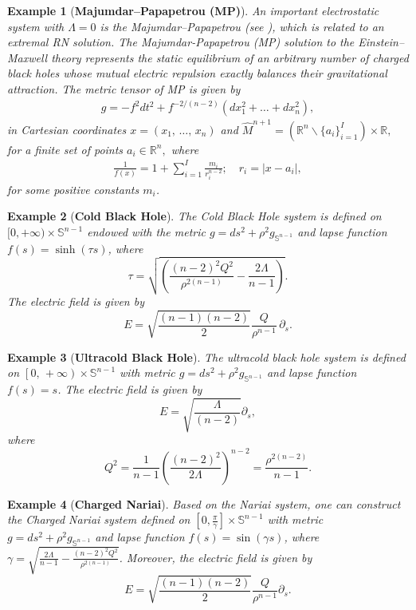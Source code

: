 \documentclass{amsart}
\newtheorem{example}{Example}
\numberwithin{equation}{section}
\begin{document}
\begin{example}[\textbf{Majumdar–Papapetrou (MP)}]	
An important electrostatic system with $\Lambda=0$ is the {\it Majumdar–Papapetrou} (see \cite{chrusciel1999,Lucietti}), which is related to an extremal RN solution. The Majumdar-Papapetrou (MP) solution to the Einstein–Maxwell theory represents the static equilibrium of an arbitrary number of charged black holes whose mutual electric repulsion exactly balances their gravitational attraction. The metric tensor of MP is given by
	\begin{eqnarray}\label{MPmetric}
		\hat{g}=-f^{2}dt^{2}+f^{-2/(n-2)}(dx_1^{2}+\ldots+dx_n^{2}),
	\end{eqnarray}
	in Cartesian coordinates $x=(x_1,\,\ldots,\,x_n)$ and $\widehat{M}^{n+1}=(\mathbb{R}^{n}\backslash\{{a_i}\}_{i=1}^I)\times\mathbb{R},$ for a finite set of points ${a_i}\in\mathbb{R}^{n},$ where
	\begin{eqnarray}\label{harmonic function MP}
		\frac{1}{f({x})}=1+\displaystyle\sum_{i=1}^{I}\frac{m_i}{r_i^{n-2}};\quad r_i=|{x}-{a_i}|,
	\end{eqnarray}
	for some positive constants $m_i$.	
\end{example}

\begin{example}[\textbf{Cold Black Hole}]
The {\it Cold Black Hole system} is defined on \( [0, +\infty) \times \mathbb{S}^{n-1} \) endowed with the metric $g = ds^{2} + \rho^{2} g_{\mathbb{S}^{n-1}}$ and lapse function $f(s) = \sinh(\tau s)$, where 
\[
\tau = \sqrt{\left( \frac{(n-2)^2 Q^{2}}{\rho^{2(n-1)}} - \frac{2\Lambda}{n-1} \right)}.
\] The electric field is given by
\[
E = \sqrt{\frac{(n-1)(n-2)}{2}} \frac{Q}{\rho^{n-1}} \, \partial_s.
\]
\end{example}		

\begin{example}[\textbf{Ultracold Black Hole}]
The {\it ultracold black hole system} is defined on $\left[0,\,+\infty\right)\times\mathbb{S}^{n-1}$ with metric $g = ds^{2} + \rho^{2}g_{\mathbb{S}^{n-1}}$ and lapse function $f(s) = s$. The electric field is given by 
$$E =\sqrt{\dfrac{\Lambda}{(n-2)}}\partial_s,$$
where 
$$Q^2=\frac{1}{n-1}\left(\frac{(n-2)^2}{2\Lambda}\right)^{n-2}=\frac{\rho^{2(n-2)}}{n-1}.$$
\end{example}



\begin{example}[\textbf{Charged Nariai}]
Based on the Nariai system, one can construct the {\it Charged Nariai system} defined on \( \left[0, \frac{\pi}{\gamma} \right] \times \mathbb{S}^{n-1} \) with metric \( g = ds^{2} + \rho^{2} g_{\mathbb{S}^{n-1}} \) and lapse function \( f(s) = \sin(\gamma s) \), where \( \gamma = \sqrt{ \frac{2\Lambda}{n-1} - \frac{(n-2)^2 Q^{2}}{\rho^{2(n-1)}} } \). Moreover, the electric field is given by $$E = \sqrt{\frac{(n-1)(n-2)}{2}} \frac{Q}{\rho^{n-1}} \partial_s.$$ 
\end{example}	
\end{document}
